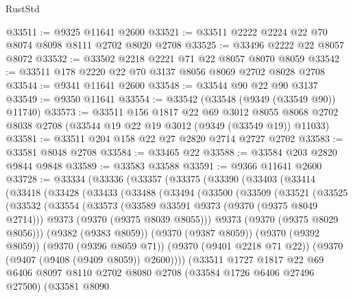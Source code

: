 \begin{lexlean}{RustStd}
\begin{coremodule}
{\begin{coremodule}
{{{{{{{{{{{{{{{{{{{{{{{{{{{{{{{{{{{{{{{@33511 := @9325 @11641 @2600
@33521 := @33511 @2222 @2224 @22 @70 @8074 @8098 @8111 @2702 @8020 @2708
@33525 := @33496 @2222 @22 @8057 @8072
@33532 := @33502 @2218 @2221 @71 @22 @8057 @8070 @8059
@33542 := @33511 @178 @2220 @22 @70 @3137 @8056 @8069 @2702 @8028 @2708
@33544 := @9341 @11641 @2600
@33548 := @33544 @90 @22 @90 @3137
@33549 := @9350 @11641
@33554 := @33542 (@33548 (@9349 (@33549 @90)) @11740)
@33573 := @33511
    @156
    @1817
    @22
    @69
    @3012
    @8055
    @8068
    @2702
    @8038
    @2708
    (@33544 @19 @22 @19 @3012 (@9349 (@33549 @19)) @11033)
@33581 := @33511 @204 @158 @22 @27 @2820 @2714 @2727 @2702
@33583 := @33581 @8048 @2708
@33584 := @33465 @22
@33588 := @33584 @203 @2820 @9844 @9848
@33589 := @33583 @33588
@33591 := @9366 @11641 @2600
@33728 := @33334
    (@33336
      (@33357
        (@33375
          (@33390
            (@33403
              (@33414
                (@33418
                  (@33428
                    (@33433
                      (@33488
                        (@33494
                          (@33500
                            (@33509
                              (@33521
                                (@33525
                                  (@33532
                                    (@33554
                                      (@33573
                                        (@33589 @33591 @9373 (@9370 (@9375 @8049 @2714)))
                                        @9373
                                        (@9370 (@9375 @8039 @8055)))
                                      @9373
                                      (@9370 (@9375 @8029 @8056)))
                                    (@9382 (@9383 @8059))
                                    (@9370 (@9387 @8059))
                                    (@9370 (@9392 @8059))
                                    (@9370 (@9396 @8059 @71))
                                    (@9370 (@9401 @2218 @71 @22))
                                    (@9370 (@9407 (@9408 (@9409 @8059)) @2600))))
                                (@33511
                                  @1727
                                  @1817
                                  @22
                                  @69
                                  @6406
                                  @8097
                                  @8110
                                  @2702
                                  @8080
                                  @2708
                                  (@33584 @1726 @6406 @27496 @27500)
                                  (@33581
                                    @8090
}}}}}}}}}}}}}}}}}}}}}}}}}}}}}}}}}}}}}}}
\end{coremodule}}
\end{coremodule}
\end{lexlean}
